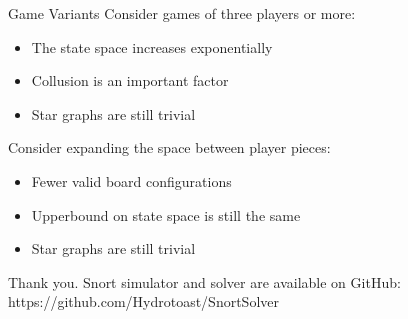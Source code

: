 \documentclass[mathserif]{beamer}
\begin{document}
\begin{frame}{Game Variants}
	Consider games of three players or more:
	\begin{itemize}
		\item The state space increases exponentially
		\pause
		\item Collusion is an important factor
		\pause
		\item Star graphs are still trivial
	\end{itemize}

	\pause
	\vfill
	Consider expanding the space between player pieces:
	\begin{itemize}
		\item Fewer valid board configurations
		\item Upperbound on state space is still the same
		\pause
		\item Star graphs are still trivial
	\end{itemize}
\end{frame}

\begin{frame}
	\begin{center}
		Thank you. Snort simulator and solver are available on GitHub: https://github.com/Hydrotoast/SnortSolver 
	\end{center}
\end{frame}
\end{document}
